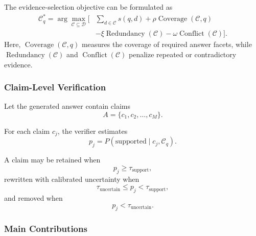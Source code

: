 \documentclass{article}
\begin{document}
The evidence-selection objective can be formulated as
\begin{equation}
\begin{split}
    \mathcal{C}_q^{*}
    =
    \arg\max_{\mathcal{C} \subseteq \mathcal{D}}
    \Big[
    &\sum_{d \in \mathcal{C}} s(q,d)
    +
    \rho \operatorname{Coverage}(\mathcal{C},q)\\
    &-
    \xi \operatorname{Redundancy}(\mathcal{C})
    -
    \omega \operatorname{Conflict}(\mathcal{C})
    \Big].
\end{split}
\end{equation}
Here, $\operatorname{Coverage}(\mathcal{C},q)$ measures the coverage of required answer facets, while $\operatorname{Redundancy}(\mathcal{C})$ and
$\operatorname{Conflict}(\mathcal{C})$ penalize repeated or contradictory evidence.

\subsubsection{Claim-Level Verification}

Let the generated answer contain claims
\begin{equation}
    A = \{c_1,c_2,\ldots,c_M\}.
\end{equation}

For each claim $c_j$, the verifier estimates
\begin{equation}
    p_j =
    P
    \left(
    \mathrm{supported}
    \mid
    c_j,\mathcal{C}_q
    \right).
\end{equation}

A claim may be retained when
\begin{equation}
    p_j \geq \tau_{\mathrm{support}},
\end{equation}
rewritten with calibrated uncertainty when
\begin{equation}
    \tau_{\mathrm{uncertain}}
    \leq
    p_j
    <
    \tau_{\mathrm{support}},
\end{equation}
and removed when
\begin{equation}
    p_j < \tau_{\mathrm{uncertain}}.
\end{equation}

\subsubsection{Main Contributions}
\end{document}
